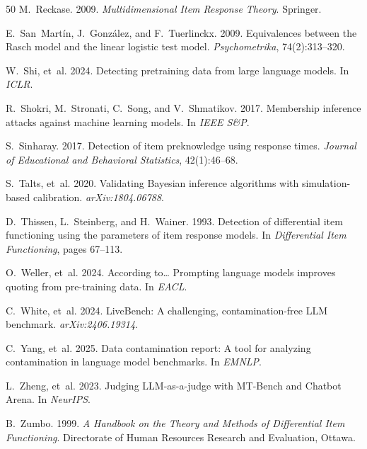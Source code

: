 \documentclass[11pt,a4paper]{article}
\begin{document}
\begin{thebibliography}{50}
M.~Reckase. 2009.
\textit{Multidimensional Item Response Theory}.
Springer.

E.~San~Mart{\'i}n, J.~Gonz{\'a}lez, and F.~Tuerlinckx. 2009.
Equivalences between the Rasch model and the linear logistic test model.
\textit{Psychometrika}, 74(2):313--320.

W.~Shi, et~al. 2024.
Detecting pretraining data from large language models.
In \textit{ICLR}.

R.~Shokri, M.~Stronati, C.~Song, and V.~Shmatikov. 2017.
Membership inference attacks against machine learning models.
In \textit{IEEE S\&P}.

S.~Sinharay. 2017.
Detection of item preknowledge using response times.
\textit{Journal of Educational and Behavioral Statistics}, 42(1):46--68.

S.~Talts, et~al. 2020.
Validating Bayesian inference algorithms with simulation-based calibration.
\textit{arXiv:1804.06788}.

D.~Thissen, L.~Steinberg, and H.~Wainer. 1993.
Detection of differential item functioning using the parameters of item response models.
In \textit{Differential Item Functioning}, pages 67--113.

O.~Weller, et~al. 2024.
According to\ldots{} Prompting language models improves quoting from pre-training data.
In \textit{EACL}.

C.~White, et~al. 2024.
LiveBench: A challenging, contamination-free LLM benchmark.
\textit{arXiv:2406.19314}.

C.~Yang, et~al. 2025.
Data contamination report: A tool for analyzing contamination in language model benchmarks.
In \textit{EMNLP}.

L.~Zheng, et~al. 2023.
Judging LLM-as-a-judge with MT-Bench and Chatbot Arena.
In \textit{NeurIPS}.

B.~Zumbo. 1999.
\textit{A Handbook on the Theory and Methods of Differential Item Functioning}.
Directorate of Human Resources Research and Evaluation, Ottawa.

\end{thebibliography}
\end{document}
